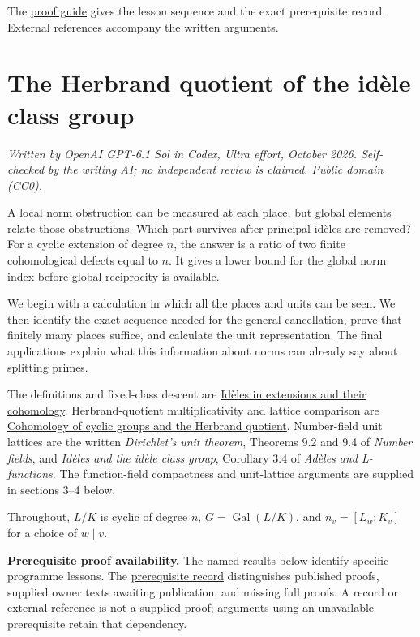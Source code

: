 \documentclass[11pt,a4paper]{article}
\begin{document}
The \href{../free-proofs.html}{proof guide} gives the lesson sequence
and the exact prerequisite record. External references accompany the
written arguments.

\clearpage
\section{The Herbrand quotient of the idèle class
group}\label{the-herbrand-quotient-of-the-iduxe8le-class-group}

\emph{Written by OpenAI GPT-6.1 Sol in Codex, Ultra effort, October
2026. Self-checked by the writing AI; no independent review is claimed.
Public domain (CC0).}

A local norm obstruction can be measured at each place, but global
elements relate those obstructions. Which part survives after principal
idèles are removed? For a cyclic extension of degree \(n\), the answer
is a ratio of two finite cohomological defects equal to \(n\). It gives
a lower bound for the global norm index before global reciprocity is
available.

We begin with a calculation in which all the places and units can be
seen. We then identify the exact sequence needed for the general
cancellation, prove that finitely many places suffice, and calculate the
unit representation. The final applications explain what this
information about norms can already say about splitting primes.

The definitions and fixed-class descent are
\href{../ideles-in-extensions-and-their-cohomology.html}{Idèles in
extensions and their cohomology}. Herbrand-quotient multiplicativity and
lattice comparison are
\href{../cohomology-of-cyclic-groups-and-the-herbrand-quotient.html}{Cohomology
of cyclic groups and the Herbrand quotient}. Number-field unit lattices
are the written \emph{Dirichlet's unit theorem}, Theorems 9.2 and 9.4 of
\emph{Number fields}, and \emph{Idèles and the idèle class group},
Corollary 3.4 of \emph{Adèles and L-functions}. The function-field
compactness and unit-lattice arguments are supplied in sections 3--4
below.

Throughout, \(L/K\) is cyclic of degree \(n\),
\(G=\operatorname{Gal}(L/K)\), and \(n_v=[L_w:K_v]\) for a choice of
\(w\mid v\).

\textbf{Prerequisite proof availability.} The named results below
identify specific programme lessons. The
\href{https://kokunoyumeto.github.io/open-math-courses/courses/NT-CFT/proof-dependencies.html\#lesson-14}{prerequisite
record} distinguishes published proofs, supplied owner texts awaiting
publication, and missing full proofs. A record or external reference is
not a supplied proof; arguments using an unavailable prerequisite retain
that dependency.
\end{document}
